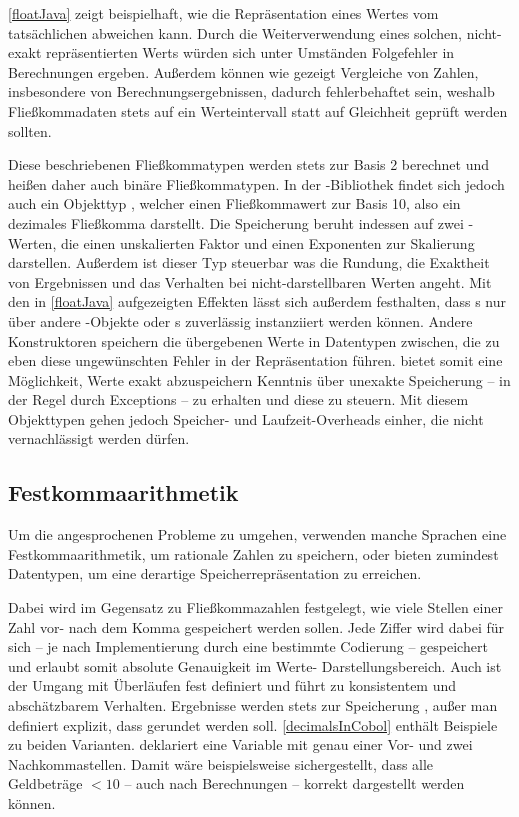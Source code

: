 \autoref{floatJava} zeigt beispielhaft, wie die Repräsentation eines Wertes vom tatsächlichen abweichen kann. Durch die Weiterverwendung eines solchen, nicht-exakt repräsentierten Werts würden sich unter Umständen Folgefehler in Berechnungen ergeben. Außerdem können wie gezeigt Vergleiche von Zahlen, insbesondere von Berechnungsergebnissen, dadurch fehlerbehaftet sein, weshalb Fließkommadaten stets auf ein Werteintervall statt auf Gleichheit geprüft werden sollten.

Diese beschriebenen Fließkommatypen werden stets zur Basis 2 berechnet und heißen daher auch binäre Fließkommatypen. In der -Bibliothek findet sich jedoch auch ein Objekttyp , welcher einen Fließkommawert zur Basis 10, also ein dezimales Fließkomma darstellt. Die Speicherung beruht in­des­sen auf zwei -Werten, die einen unskalierten Faktor und einen Exponenten zur Skalierung darstellen. Außerdem ist dieser Typ steuerbar was die Rundung, die Exaktheit von Ergebnissen und das Verhalten bei nicht-darstellbaren Werten angeht. Mit den in \autoref{floatJava} aufgezeigten Effekten lässt sich außerdem festhalten, dass s nur über andere -Objekte oder s zuverlässig instanziiert werden können. Andere Konstruktoren speichern die übergebenen Werte in Datentypen zwischen, die zu eben diese ungewünschten Fehler in der Repräsentation führen.  bietet somit eine Möglichkeit, Werte exakt abzuspeichern \bzw Kenntnis über unexakte Speicherung -- in der Regel durch Exceptions -- zu erhalten und diese zu steuern. Mit diesem Objekttypen gehen jedoch Speicher- und Laufzeit-Overheads einher, die nicht vernachlässigt werden dürfen.

\subsection*{Festkommaarithmetik}
Um die angesprochenen Probleme zu umgehen, verwenden manche Sprachen eine Festkommaarithmetik, um rationale Zahlen zu speichern, oder bieten zumindest Datentypen, um eine derartige Speicherrepräsentation zu erreichen. 

Dabei wird im Gegensatz zu Fließkommazahlen festgelegt, wie viele Stellen einer Zahl vor- \bzw nach dem Komma gespeichert werden sollen. Jede Ziffer wird dabei für sich -- je nach Implementierung durch eine bestimmte Codierung -- gespeichert und erlaubt somit absolute Genauigkeit im Werte- \bzw Darstellungsbereich. Auch ist der Umgang mit Überläufen fest definiert und führt zu konsistentem und abschätzbarem Verhalten. Ergebnisse werden stets zur Speicherung , außer man definiert explizit, dass gerundet werden soll. \autoref{decimalsInCobol} enthält Beispiele zu beiden Varianten.  deklariert eine Variable mit genau einer Vor- und zwei Nachkommastellen. Damit wäre beispielsweise sichergestellt, dass alle Geldbeträge $<10$ -- auch nach Berechnungen -- korrekt dargestellt werden können.

